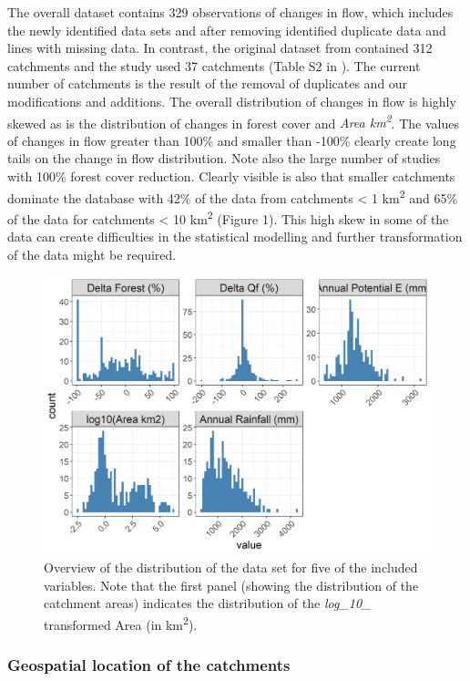 \documentclass[]{elsarticle} %
\begin{document}
The overall dataset contains 329 observations of changes in flow, which includes the newly identified data sets and after removing identified duplicate data and lines with missing data. In contrast, the original dataset from \citet{zhang2017} contained 312 catchments and the \citet{filoso2017} study used 37 catchments (Table S2 in \citet{filoso2017}). The current number of catchments is the result of the removal of duplicates and our modifications and additions. The overall distribution of changes in flow is highly skewed as is the distribution of changes in forest cover and \emph{Area km\textsuperscript{2}}. The values of changes in flow greater than 100\% and smaller than -100\% clearly create long tails on the change in flow distribution. Note also the large number of studies with 100\% forest cover reduction. Clearly visible is also that smaller catchments dominate the database with 42\% of the data from catchments \textless{} 1 km\textsuperscript{2} and 65\% of the data for catchments \textless{} 10 km\textsuperscript{2} (Figure 1). This high skew in some of the data can create difficulties in the statistical modelling and further transformation of the data might be required.



\begin{figure}
\includegraphics[width=0.9\linewidth]{./DataExploration} \caption{Overview of the distribution of the data set for five of the included variables. Note that the first panel (showing the distribution of the catchment areas) indicates the distribution of the \emph{log\_10\_} transformed Area (in km\textsuperscript{2}).}\label{fig:datagraphs}
\end{figure}

\hypertarget{geospatial-location-of-the-catchments}{%
\subsubsection{Geospatial location of the catchments}\label{geospatial-location-of-the-catchments}}
\end{document}
